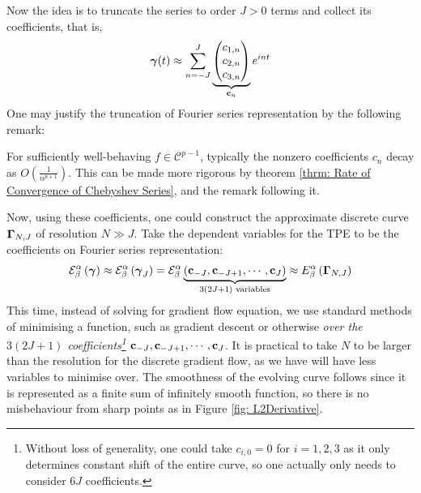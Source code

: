 \documentclass[../dissertation.tex]{subfiles}
\begin{document}
Now the idea is to truncate the series to order $J > 0$ terms and collect its coefficients,
that is,
\begin{equation*}
    \boldsymbol{\gamma}(t) \approx \sum_{n=-J}^{J}
    \underbrace{
    \begin{pmatrix}
        c_{1,n} \\
        c_{2,n} \\
        c_{3,n}
    \end{pmatrix}
}_{\mathbf{c}_n}
    e^{int}
\end{equation*}
One may justify the truncation of Fourier series representation by the following remark:
\begin{remark}
    For sufficiently well-behaving $f \in \mathcal{C}^{p-1}$, typically the nonzero coefficients $c_n$ decay as $O\left( \frac{1}{n^{p+1}} \right)$.
    This can be made more rigorous by theorem \ref{thrm: Rate of Convergence of Chebyshev Series},
    and the remark following it.
\end{remark}
Now, using these coefficients, one could construct the approximate discrete curve $\boldsymbol{\Gamma}_{N,J}$ of resolution $N \gg J$.
Take the dependent variables for the TPE to be the coefficients on Fourier series representation:
\begin{equation}
    \mathcal{E}_{\beta}^{\alpha} \left( \boldsymbol{\gamma} \right)
    \approx
    \mathcal{E}_{\beta}^{\alpha} \left( \boldsymbol{\gamma}_{J} \right)
    =
    \mathcal{E}_{\beta}^{\alpha} \underbrace{\left( \mathbf{c}_{-J}, \mathbf{c}_{-J+1}, \cdots, \mathbf{c}_{J} \right)}_{3\left( 2J+1 \right) \text{ variables}}
    \approx
    E_{\beta}^{\alpha} \left( \boldsymbol{\Gamma}_{N,J} \right)
\end{equation}
This time, instead of solving for gradient flow equation,
we use standard methods of minimising a function, such as gradient descent or otherwise \textit{over the $3(2J+1)$ coefficients\footnote{Without loss of generality, one could take $c_{i,0} = 0$ for $i=1,2,3$ as it only determines constant shift of the entire curve, so one actually only needs to consider $6J$ coefficients.}} $\mathbf{c}_{-J}, \mathbf{c}_{-J+1}, \cdots, \mathbf{c}_{J}$.
It is practical to take $N$ to be larger than the resolution for the discrete gradient flow,
as we have will have less variables to minimise over.
The smoothness of the evolving curve follows since it is represented as a finite sum of infinitely smooth function,
so there is no misbehaviour from sharp points as in Figure \ref{fig: L2Derivative}.
\end{document}
